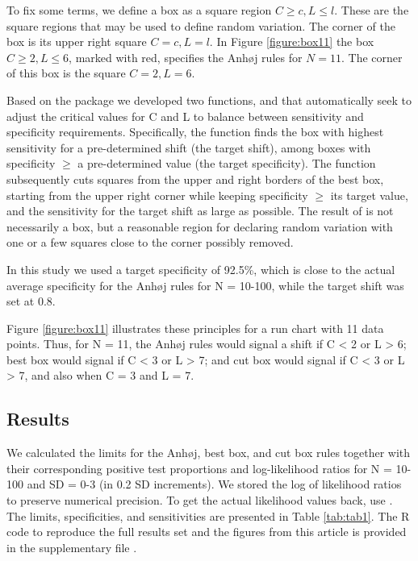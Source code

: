 To fix some terms, we define a box as a square region
\(C \geq c, L \leq l\). These are the square regions that may be used to
define random variation. The corner of the box is its upper right square
\(C = c, L = l\). In Figure \ref{figure:box11} the box
\(C \geq 2, L \leq 6\), marked with red, specifies the Anhøj rules for
\(N=11\). The corner of this box is the square \(C = 2, L = 6\).

Based on the  package we developed two functions,
 and  that automatically seek to adjust
the critical values for C and L to balance between sensitivity and
specificity requirements. Specifically, the  function
finds the box with highest sensitivity for a pre-determined shift (the
target shift), among boxes with specificity \(\geq\) a pre-determined
value (the target specificity). The  function
subsequently cuts squares from the upper and right borders of the best
box, starting from the upper right corner while keeping specificity
\(\geq\) its target value, and the sensitivity for the target shift as
large as possible. The result of  is not necessarily a
box, but a reasonable region for declaring random variation with one or
a few squares close to the corner possibly removed.

In this study we used a target specificity of 92.5\%, which is close to
the actual average specificity for the Anhøj rules for N = 10-100, while
the target shift was set at 0.8.

Figure \ref{figure:box11} illustrates these principles for a run chart
with 11 data points. Thus, for N = 11, the Anhøj rules would signal a
shift if C \textless{} 2 or L \textgreater{} 6; best box would signal if
C \textless{} 3 or L \textgreater{} 7; and cut box would signal if C
\textless{} 3 or L \textgreater{} 7, and also when C = 3 and L = 7.

\hypertarget{results}{%
\subsection{Results}\label{results}}

We calculated the limits for the Anhøj, best box, and cut box rules
together with their corresponding positive test proportions and
log-likelihood ratios for N = 10-100 and SD = 0-3 (in 0.2 SD
increments). We stored the log of likelihood ratios to preserve
numerical precision. To get the actual likelihood values back, use
. The limits, specificities, and sensitivities
are presented in Table \ref{tab:tab1}. The R code to reproduce the full
results set and the figures from this article is provided in the
supplementary file .

